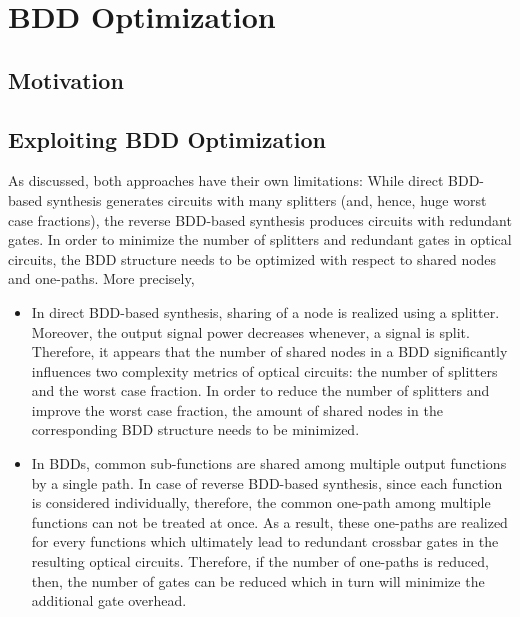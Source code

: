 \documentclass[10pt,letterpaper,twoside,openright]{book}
\begin{document}
\section{BDD Optimization}

\subsection{Motivation}

\newpage

\subsection{Exploiting BDD Optimization}



As discussed, both approaches have their own limitations: While direct BDD-based synthesis generates circuits with many splitters (and, hence, huge worst case fractions), the reverse BDD-based synthesis produces circuits with redundant gates. In order to minimize the number of splitters and redundant gates in optical circuits, the BDD structure needs to be optimized with respect to shared nodes and one-paths.   
More precisely,

\begin{itemize}

\item In direct BDD-based synthesis, sharing of a node is realized using a splitter. Moreover, the output signal power decreases whenever, a signal is split. Therefore, it appears that the number of shared nodes in a BDD significantly influences two complexity metrics of optical circuits: the number of splitters and the worst case fraction. In order to reduce the number of splitters and improve the worst case fraction, the amount of shared nodes in the corresponding BDD structure needs to be minimized.

\item In BDDs,  common sub-functions are shared among multiple output functions by a single path. In case of reverse BDD-based synthesis, since each function is considered individually, therefore, the common one-path among multiple functions can not be treated at once. As a result, these one-paths are realized for every functions which ultimately lead to redundant crossbar gates in the resulting optical circuits. Therefore, if the number of one-paths is reduced, then, the number of gates can be reduced which in turn will minimize the additional gate overhead. 
\end{itemize}
\end{document}
